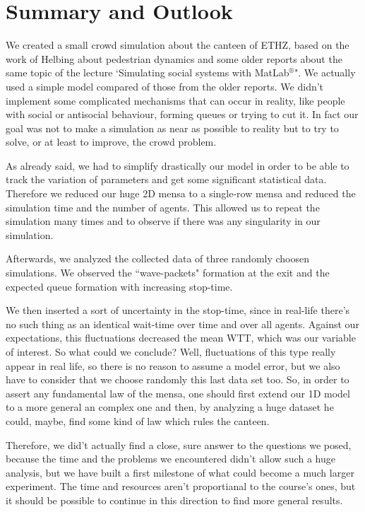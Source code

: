 \documentclass[11pt]{article}
\begin{document}
\newpage
\section{Summary and Outlook}
 
We created a small crowd simulation about the canteen of ETHZ, based on the work of Helbing about pedestrian dynamics and some older reports about the same topic of the lecture `Simulating social systems with MatLab$^{®}$". We actually used a simple model compared of those from the older reports. We didn't implement some complicated mechanisms that can occur in reality, like people with social or antisocial behaviour, forming queues or trying to cut it.
In fact our goal was not to make a simulation as near as possible to reality but to try to solve, or at least to improve, the crowd problem.

As already said, we had to simplify drastically our model in order to be able to track the variation of parameters and get some significant statistical data. Therefore we reduced our huge 2D mensa to a single-row mensa and reduced the simulation time and the number of agents. This allowed us to repeat the simulation many times and to observe if there was any singularity in our simulation.

Afterwards, we analyzed the collected data of three randomly choosen simulations. We observed the ``wave-packets" formation at the exit and the expected queue formation with increasing stop-time.

We then inserted a sort of uncertainty in the stop-time, since in real-life there's no such thing as an identical wait-time over time and over all agents. Against our expectations, this fluctuations decreased the mean WTT, which was our variable of interest. So what could we conclude? Well, fluctuations of this type really appear in real life, so there is no reason to assume a model error, but we also have to consider that we choose randomly this last data set too. So, in order to assert any fundamental law of the mensa, one should first extend our 1D model to a more general an complex one and then, by analyzing a huge dataset he could, maybe, find some kind of law which rules the canteen.

Therefore, we did't actually find a close, sure answer to the questions we posed, because the time and the problems we encountered didn't allow such a huge analysis, but we have built a first milestone of what could become a much larger experiment. The time and resources aren't proportianal to the course's ones, but it should be possible to continue in this direction to find more general results.
\end{document}
